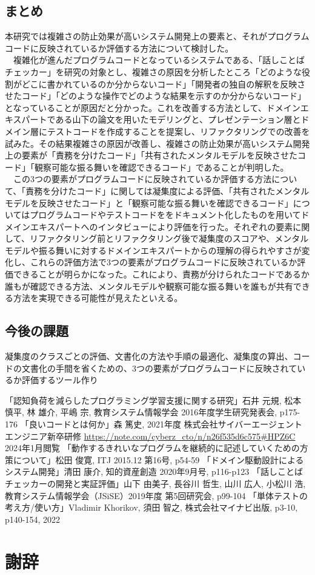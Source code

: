 \documentclass[12pt, a4paper]{jreport}
\begin{document}
\section{まとめ}
本研究では複雑さの防止効果が高いシステム開発上の要素と、それがプログラムコードに反映されているか評価する方法について検討した。
\\　複雑化が進んだプログラムコードとなっているシステムである、「話しことばチェッカー」を研究の対象とし、複雑さの原因を分析したところ「どのような役割がどこに書かれているのか分からないコード」「開発者の独自の解釈を反映させたコード」「どのような操作でどのような結果を示すのか分からないコード」となっていることが原因だと分かった。これを改善する方法として、ドメインエキスパートである山下の論文を用いたモデリングと、プレゼンテーション層とドメイン層にテストコードを作成することを提案し、リファクタリングでの改善を試みた。その結果複雑さの原因が改善し、複雑さの防止効果が高いシステム開発上の要素が「責務を分けたコード」「共有されたメンタルモデルを反映させたコード」「観察可能な振る舞いを確認できるコード」であることが判明した。
\\　この3つの要素がプログラムコードに反映されているか評価する方法について、「責務を分けたコード」に関しては凝集度による評価、「共有されたメンタルモデルを反映させたコード」と「観察可能な振る舞いを確認できるコード」についてはプログラムコードやテストコードををドキュメント化したものを用いてドメインエキスパートへのインタビューにより評価を行った。それぞれの要素に関して、リファクタリング前とリファクタリング後で凝集度のスコアや、メンタルモデルや振る舞いに対するドメインエキスパートからの理解の得られやすさが変化し、これらの評価方法で3つの要素がプログラムコードに反映されているか評価できることが明らかになった。これにより、責務が分けられたコードであるか誰もが確認できる方法、メンタルモデルや観察可能な振る舞いを誰もが共有できる方法を実現できる可能性が見えたといえる。
\section{今後の課題}
凝集度のクラスごとの評価、文書化の方法や手順の最適化、凝集度の算出、コードの文書化の手間を省くための、3つの要素がプログラムコードに反映されているか評価するツール作り
\renewcommand{\bibname}{参考文献}
\begin{thebibliography}{20}
「認知負荷を減らしたプログラミング学習支援に関する研究」石井 元規, 松本 慎平, 林 雄介, 平嶋 宗, 教育システム情報学会 2016年度学生研究発表会, p175-176
「良いコードとは何か」森 篤史, 2021年度 株式会社サイバーエージェント エンジニア新卒研修
\url{https://note.com/cyberz_cto/n/n26f535d6c575#HPZ6C} 2024年1月閲覧
「動作するきれいなプログラムを継続的に記述していくための方策について」松田 俊寛, ITJ 2015.12 第16号, p54-59
「ドメイン駆動設計によるシステム開発」清田 康介, 知的資産創造 2020年9月号, p116-p123
「話しことばチェッカーの開発と実証評価」山下 由美子, 長谷川 哲生, 山川 広人, 小松川 浩, 教育システム情報学会（JSiSE）2019年度 第5回研究会, p99-104
「単体テストの考え方/使い方」Vladimir Khorikov, 須田 智之, 株式会社マイナビ出版, p3-10, p140-154, 2022
\end{thebibliography}

\chapter*{謝辞}
\end{document}
